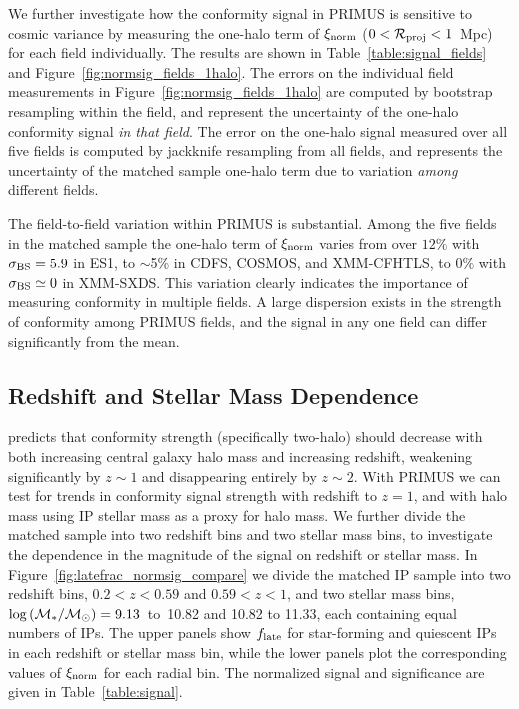 We further investigate how the conformity signal in PRIMUS is sensitive to cosmic variance by measuring the one-halo term of $\signorm$ {($0<\mathcal{R}_{\text{proj}}<1$~Mpc)} for each field individually.
The results are shown in Table~\ref{table:signal_fields} and Figure~\ref{fig:normsig_fields_1halo}.
The errors on the individual field measurements in Figure~\ref{fig:normsig_fields_1halo} are computed by bootstrap resampling within the field, and represent the uncertainty of the one-halo conformity signal \emph{in that field}.
The error on the one-halo signal measured over all five fields is computed by jackknife resampling from all fields, and represents the uncertainty of the matched sample one-halo term due to variation \emph{among} different fields.

The field-to-field variation within PRIMUS is substantial.
Among the five fields in the matched sample the one-halo term of 
$\signorm$ varies from over $12\%$ with $\sigmaBS=5.9$ in ES1, to $\sim$5\% in 
CDFS, COSMOS, and XMM-CFHTLS, to $0\%$ with $\sigmaBS\simeq0$ in XMM-SXDS.
This variation clearly indicates the importance of measuring conformity in multiple fields.  A large dispersion exists in the strength of conformity among PRIMUS fields, and the signal in any one field can differ significantly from the mean.


\subsection{Redshift and Stellar Mass Dependence}\label{sec:z_mass_bins}

\citet{Hearin15b} predicts that conformity strength (specifically two-halo) should decrease with both increasing central galaxy halo mass and increasing redshift, weakening significantly by $z\sim1$ and disappearing entirely by $z\sim2$.
With PRIMUS we can test for trends in conformity signal strength with redshift to $z=1$, and with halo mass using IP stellar mass as a proxy for halo mass.
We further divide the matched sample into two redshift bins and two stellar mass bins, 
to investigate the dependence in the magnitude of the signal on redshift or 
stellar mass.
In Figure~\ref{fig:latefrac_normsig_compare} we divide the matched IP sample into two redshift bins, ${0.2<z<0.59}$ and ${0.59<z<1}$, and two stellar mass bins, 
${\log\,(\mstar/\msun)=9.13}$~to~10.82 and 10.82 to 11.33, each containing equal numbers of IPs.
The upper panels show $\flate$ for star-forming and quiescent IPs in each redshift or stellar mass bin, while the lower panels plot the corresponding values of
$\signorm$ for each radial bin. The normalized signal and significance are given in 
Table~\ref{table:signal}.

